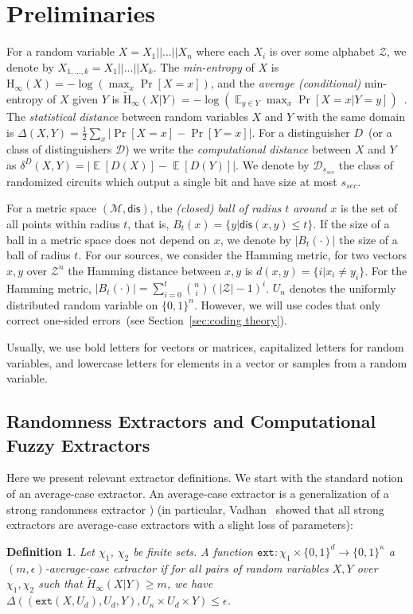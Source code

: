 \documentclass[11pt]{article}
\newcommand{\secref}[1]{\mbox{Section~\ref{#1}}}
\DeclareMathOperator*{\expe}{\mathbb{E}}
\newcommand{\dis}{\ensuremath{\mathsf{dis}}}
\newcommand{\Hoo}{\mathrm{H}_\infty}
\newcommand{\Hav}{\tilde{\mathrm{H}}_\infty}
\newcommand{\ext}{\ensuremath{\mathtt{ext}}}
\newtheorem{definition}[theorem]{Definition}
\begin{document}
\section{Preliminaries}
\label{sec:preliminaries}
For a random variable $X = X_1||...|| X_n$ where each $X_i$ is over some alphabet $\mathcal{Z}$, we denote by $X_{1,..., k} = X_1||...|| X_k$.  The {\em min-entropy} of $X$ is $\Hoo(X) = -\log(\max_x \Pr[X=x])$, 
and the {\em average (conditional)} min-entropy of $X$ given $Y$ is  $\Hav(X|Y) = -\log(\expe_{y\in Y} \max_{x} \Pr[X=x|Y=y])$~\cite[Section 2.4]{DBLP:journals/siamcomp/DodisORS08}.  
The {\em statistical distance} between random variables $X$ and $Y$ with the same domain is $\Delta(X,Y) = \frac12 \sum_x |\Pr[X=x] - \Pr[Y=x]|$. 
For a distinguisher $D$~(or a class of distinguishers $\mathcal{D}$) we write the \emph{computational distance} between $X$ and $Y$ as $\delta^D(X,Y) = \left| \expe[D(X)]-\expe[D(Y)]\right |$.  We denote by $\mathcal{D}_{s_{sec}}$ the class of randomized circuits which output a single bit and have size at most $s_{sec}$.

For a metric space $(\mathcal{M}, \dis)$, the \emph{(closed) ball of radius $t$ around $x$} is the set of all points within radius $t$, that is, $B_t(x) = \{y| \dis(x, y)\leq t\}$.  If the size of a ball in a metric space does not depend on $x$, we denote by $|B_t(\cdot)|$ the size of a ball of radius $t$.  For our sources, we consider the Hamming metric, for two vectors $x, y$ over $\mathcal{Z}^n$ the Hamming distance between $x,y$ is $d(x,y) = \{i | x_i \neq y_i\}$.  For the Hamming metric, $|B_t(\cdot)| = \sum_{i=0}^t {n \choose i} (|\mathcal{Z}|-1)^i $.  $U_n$ denotes the uniformly  distributed random variable on $\{0,1\}^n$.  However, we will use codes that only correct one-sided errors~(see \secref{sec:coding theory}).


Usually, we use bold letters for vectors or matrices, capitalized letters for random variables, and lowercase letters for elements in a vector or samples from a random variable. 

\subsection{Randomness Extractors and Computational Fuzzy Extractors}
\label{sec:fuzzy extractors}

Here we present relevant extractor definitions.  We start with the standard notion of an average-case extractor. An average-case extractor is a generalization of a strong randomness extractor \cite[Definition 2]{nisan1993randomness}) (in particular, Vadhan~\cite[Problem 6.8]{Vad12} showed that all strong extractors are average-case extractors with a slight loss of parameters):
\begin{definition}
Let $\chi_1$, $\chi_2$ be finite sets.
A function $\ext: \chi_1\times \{0,1\}^d \rightarrow \{0,1\}^\kappa$ a \emph{$(m, \epsilon)$-average-case extractor} if for all pairs
of random variables $X, Y$ over $\chi_1, \chi_2$ such that
$\tilde{H}_\infty(X|Y) \ge m$, we have $\Delta((\ext(X, U_d), U_d, Y), U_\kappa\times
U_d \times Y) \le \epsilon$.
\end{definition}
\end{document}
